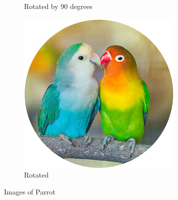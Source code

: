 \documentclass{article}
\begin{document}
\begin{figure}
\begin{subfigure}{0.3\textwidth}
                \caption{Rotated by 90 degrees}
            \end{subfigure}
            \hfill
            \begin{subfigure}{0.3\textwidth}
                \includegraphics[angle=180, width=\textwidth]{parrot.jpeg}
                \caption{Rotated}
            \end{subfigure}
        \caption{Images of Parrot}
    \end{figure}
\end{document}
